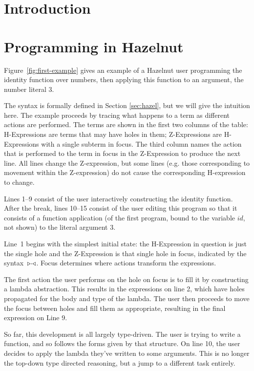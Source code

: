 \documentclass{llncs}
\begin{document}
\section{Introduction}
%


\section{Programming in Hazelnut}
\label{sec:example}
%
Figure~\ref{fig:first-example} gives an example of a Hazelnut user
programming the identity function over numbers, then applying this function
to an argument, the number literal $3$. 

The syntax is formally defined in Section \ref{sec:hazel}, but we will give the intuition here.
The example proceeds by tracing what happens to a term as different
actions are performed. The terms are shown in the first two columns of the
table: H-Expressions are terms that may have holes in them; Z-Expressions
are H-Expressions with a single subterm in focus. The third column names the action that is performed to the term in
focus in the Z-Expression to produce the next line. All lines change the Z-expression, but some lines (e.g. those corresponding to movement within the Z-expression) do not cause the corresponding H-expression to change.

%
Lines 1--9 consist of the user interactively constructing the identity
function. After the break, lines 10--15 consist of the user editing this
program so that it consists of a function application (of the first
program, bound to the variable $id$, not shown) to the literal argument $3$.

Line~1 begins with the simplest initial state: the H-Expression in question
is just the single hole and the Z-Expression is that single hole in focus,
indicated by the syntax~${\triangleright}{\cdot}{\triangleleft}$. Focus determines where actions
transform the expressions.

The first action the user performs on the hole on focus is to fill it by
constructing a lambda abstraction. This results in the expressions on line
2, which have holes propagated for the body and type of the lambda. The
user then proceeds to move the focus between holes and fill them as
appropriate, resulting in the final expression on Line 9.

So far, this development is all largely type-driven. The user is trying to
write a function, and so follows the forms given by that structure. On line
10, the user decides to apply the lambda they've written to some
arguments. This is no longer the top-down type directed reasoning, but a
jump to a different task entirely.
\end{document}

